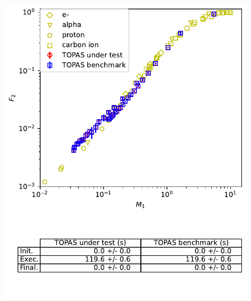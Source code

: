 \documentclass[aspectratio=1610]{beamer}
\begin{document}
\begin{frame}{\secname}
  \begin{columns}
    \begin{column}{0.4\linewidth}
     \includegraphics[width=\textwidth]{./NanodosimetryII/nanoII_TsEMDNAPhysics}
    \end{column}
    \begin{column}{0.4\linewidth} 

\end{column}
\end{columns}
\end{frame}
\end{document}
